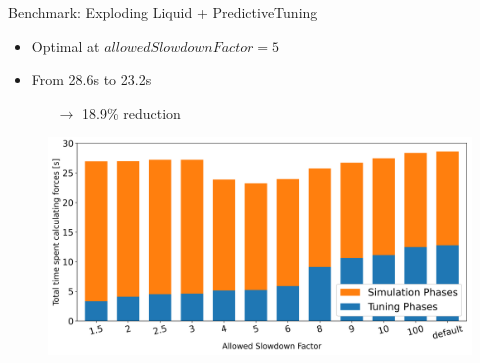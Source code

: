 \documentclass[
	10pt,
	t		%
]{beamer}
\begin{document}
\begin{frame}{Benchmark: Exploding Liquid + PredictiveTuning}

    \begin{itemize}
        \item Optimal at $allowedSlowdownFactor = 5$
        \item From 28.6s to 23.2s
              \begin{itemize}
                  \item[$\rightarrow$] 18.9\% reduction
              \end{itemize}
    \end{itemize}


    \begin{figure}[H]
        \centering

        \includegraphics[width=0.92\columnwidth]{../../data/explodingLiquid/cluster/predictiveTuning/analytics/total_time_average_full_scale.png}


    \end{figure}

\end{frame}
\end{document}
